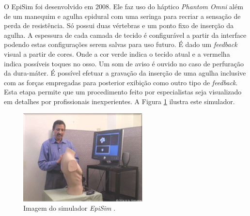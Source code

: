 O EpiSim \cite{YantricInc2011} foi desenvolvido em 2008. Ele faz uso do háptico \textit{Phantom Omni} além de um manequim e agulha epidural com uma seringa para recriar a sensação de perda de resistência. Só possui duas vértebras e um ponto fixo de inserção da agulha. A espessura de cada camada de tecido é configurável a partir da interface podendo estas configurações serem salvas para uso futuro. É dado um \textit{feedback} visual a partir de cores. Onde a cor verde indica o tecido atual e a vermelha indica possíveis toques no osso. Um som de aviso é ouvido no caso de perfuração da dura-máter. É possível efetuar a gravação da inserção de uma agulha inclusive com as forças empregadas para posterior exibição como outro tipo de \textit{feedback}. Esta etapa permite que um procedimento feito por especialistas seja visualizado em detalhes por profissionais inexperientes. A Figura \ref{fig:epiSim} ilustra este simulador.

\begin{figure}[ht!]
    \centering
    \includegraphics[width=0.4\linewidth]{capitulos/figuras/epiSim.png} 
    \caption{Imagem do simulador \textit{EpiSim} \cite{Frazzetto2011}.}
    \label{fig:epiSim}
\end{figure}


